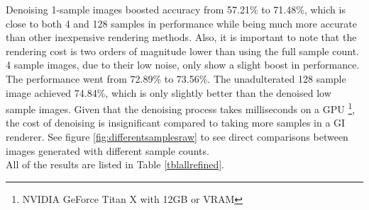 \documentclass[10pt,twocolumn,letterpaper]{article}
\begin{document}
Denoising 1-sample images boosted accuracy from 57.21\% to 71.48\%, which is close to both 4 and 128 samples in performance while being much more accurate than other inexpensive rendering methods. Also, it is important to note that the rendering cost is two orders of magnitude lower than using the full sample count. 4 sample images, due to their low noise, only show a slight boost in performance.  The performance went from 72.89\% to 73.56\%.  The unadulterated 128 sample image achieved 74.84\%, which is only slightly better than the denoised low sample images.  Given that the denoising process takes milliseconds on a GPU \footnote{NVIDIA GeForce Titan X with 12GB or VRAM}, the cost of denoising is insignificant compared to taking more samples in a GI renderer.  See figure \ref{fig:differentsamplesraw} to see direct comparisons between images generated with different sample counts.\\

All of the results are listed in Table \ref{tblallrefined}.

\end{document}
